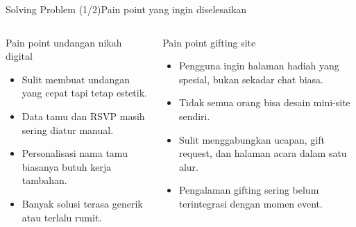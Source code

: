 \documentclass[aspectratio=169,11pt]{beamer}
\begin{document}
\begin{frame}{Solving Problem (1/2)}{Pain point yang ingin diselesaikan}
\begin{columns}[T,totalwidth=\textwidth]
\begin{block}{Pain point undangan nikah digital}
\small
\begin{itemize}
  \item Sulit membuat undangan yang cepat tapi tetap estetik.
  \item Data tamu dan RSVP masih sering diatur manual.
  \item Personalisasi nama tamu biasanya butuh kerja tambahan.
  \item Banyak solusi terasa generik atau terlalu rumit.
\end{itemize}
\end{block}

\begin{block}{Pain point gifting site}
\small
\begin{itemize}
  \item Pengguna ingin halaman hadiah yang spesial, bukan sekadar chat biasa.
  \item Tidak semua orang bisa desain mini-site sendiri.
  \item Sulit menggabungkan ucapan, gift request, dan halaman acara dalam satu alur.
  \item Pengalaman gifting sering belum terintegrasi dengan momen event.
\end{itemize}
\end{block}
\end{columns}
\end{frame}
\end{document}
